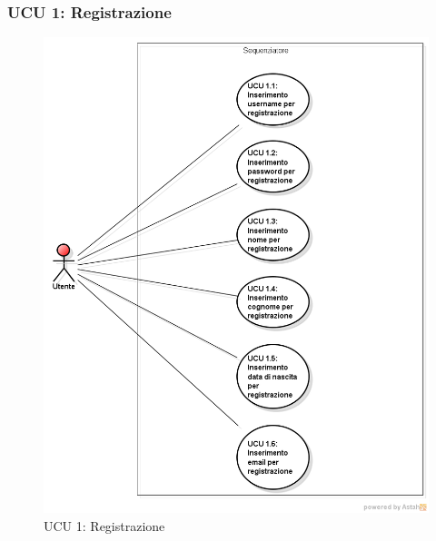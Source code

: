 \hypertarget{U1}{}
\subsubsection{UCU 1: Registrazione}
\begin{figure}[H]
\centering
\includegraphics[trim=0cm 0.8cm 0cm 0cm,clip=true,width=%
\textwidth]
{./grafici/U1}
\caption{UCU 1: Registrazione}
\end{figure}
